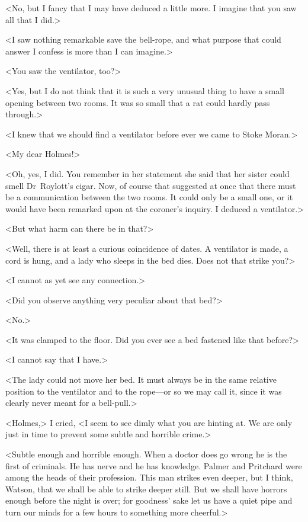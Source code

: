 <No, but I fancy that I may have deduced a little more. I imagine that you saw all that I did.>

<I saw nothing remarkable save the bell-rope, and what purpose that could answer I confess is more than I can imagine.>

<You saw the ventilator, too?>

<Yes, but I do not think that it is such a very unusual thing to have a small opening between two rooms. It was so small that a rat could hardly pass through.>

<I knew that we should find a ventilator before ever we came to Stoke Moran.>

<My dear Holmes!>

<Oh, yes, I did. You remember in her statement she said that her sister could smell Dr~Roylott's cigar. Now, of course that suggested at once that there must be a communication between the two rooms. It could only be a small one, or it would have been remarked upon at the coroner's inquiry. I deduced a ventilator.>

<But what harm can there be in that?>

<Well, there is at least a curious coincidence of dates. A ventilator is made, a cord is hung, and a lady who sleeps in the bed dies. Does not that strike you?>

<I cannot as yet see any connection.>

<Did you observe anything very peculiar about that bed?>

<No.>

<It was clamped to the floor. Did you ever see a bed fastened like that before?>

<I cannot say that I have.>

<The lady could not move her bed. It must always be in the same relative position to the ventilator and to the rope—or so we may call it, since it was clearly never meant for a bell-pull.>

<Holmes,> I cried, <I seem to see dimly what you are hinting at. We are only just in time to prevent some subtle and horrible crime.>

<Subtle enough and horrible enough. When a doctor does go wrong he is the first of criminals. He has nerve and he has knowledge. Palmer and Pritchard were among the heads of their profession. This man strikes even deeper, but I think, Watson, that we shall be able to strike deeper still. But we shall have horrors enough before the night is over; for goodness' sake let us have a quiet pipe and turn our minds for a few hours to something more cheerful.>

